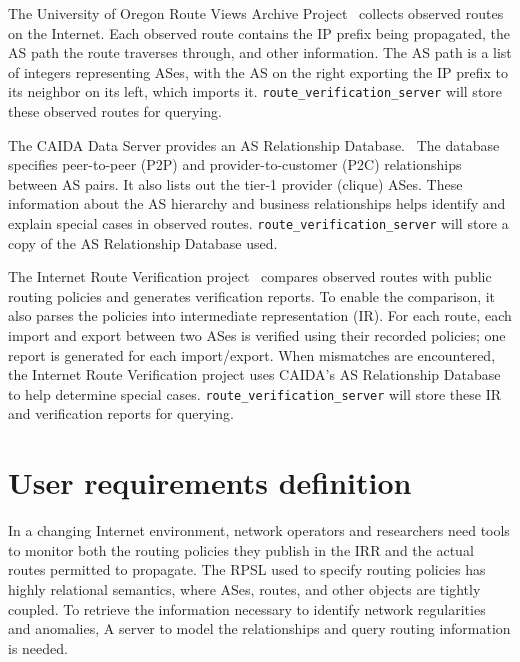 \documentclass[12pt]{article}
\begin{document}
The University of Oregon Route Views Archive Project~\cite{route2023}
collects observed routes on the Internet.
Each observed route contains the IP prefix being propagated,
the AS path the route traverses through,
and other information.
The AS path is a list of integers representing ASes,
with the AS on the right exporting the IP prefix to its neighbor on
its left,
which imports it.
\verb|route_verification_server| will store these observed routes for
querying.

The CAIDA Data Server provides an AS Relationship Database.~\cite{index2023}
The database specifies peer-to-peer (P2P) and provider-to-customer (P2C)
relationships between AS pairs.
It also lists out the tier-1 provider (clique) ASes.
These information about the AS hierarchy and business relationships helps
identify and explain special cases in observed routes.
\verb|route_verification_server| will store a copy of the
AS Relationship Database used.

The Internet Route Verification project~\cite{internet2023he}
compares observed routes with public routing policies and
generates verification reports.
To enable the comparison,
it also parses the policies into intermediate representation (IR).
For each route,
each import and export between two ASes is verified using
their recorded policies;
one report is generated for each import/export.
When mismatches are encountered,
the Internet Route Verification project uses
CAIDA's AS Relationship Database to help determine special cases.
\verb|route_verification_server| will store these IR and
verification reports for querying.

\section{User requirements definition}

In a changing Internet environment,
network operators and researchers need tools to monitor both
the routing policies they publish in the IRR and
the actual routes permitted to propagate.
The RPSL used to specify routing policies has highly relational semantics,
where ASes, routes, and other objects are tightly coupled.
To retrieve the information necessary to identify network regularities and anomalies,
A server to model the relationships and query routing information is needed.
\end{document}
